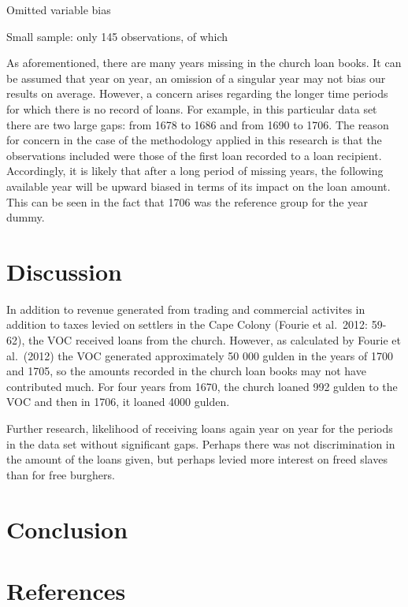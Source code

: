 \documentclass[11pt,preprint, authoryear]{elsarticle}
\numberwithin{equation}{section}
\numberwithin{figure}{section}
\numberwithin{table}{section}
\begin{document}
Omitted variable bias

Small sample: only 145 observations, of which

As aforementioned, there are many years missing in the church loan
books. It can be assumed that year on year, an omission of a singular
year may not bias our results on average. However, a concern arises
regarding the longer time periods for which there is no record of loans.
For example, in this particular data set there are two large gaps: from
1678 to 1686 and from 1690 to 1706. The reason for concern in the case
of the methodology applied in this research is that the observations
included were those of the first loan recorded to a loan recipient.
Accordingly, it is likely that after a long period of missing years, the
following available year will be upward biased in terms of its impact on
the loan amount. This can be seen in the fact that 1706 was the
reference group for the year dummy.

\hypertarget{discussion}{%
\section{\texorpdfstring{Discussion
\label{Discussion}}{Discussion }}\label{discussion}}

In addition to revenue generated from trading and commercial activites
in addition to taxes levied on settlers in the Cape Colony (Fourie et
al.~2012: 59-62), the VOC received loans from the church. However, as
calculated by Fourie et al.~(2012) the VOC generated approximately 50
000 gulden in the years of 1700 and 1705, so the amounts recorded in the
church loan books may not have contributed much. For four years from
1670, the church loaned 992 gulden to the VOC and then in 1706, it
loaned 4000 gulden.

Further research, likelihood of receiving loans again year on year for
the periods in the data set without significant gaps. Perhaps there was
not discrimination in the amount of the loans given, but perhaps levied
more interest on freed slaves than for free burghers.

\hypertarget{conclusion}{%
\section{\texorpdfstring{Conclusion
\label{Conclusion}}{Conclusion }}\label{conclusion}}

\newpage

\hypertarget{references}{%
\section*{References}\label{references}}
\end{document}
